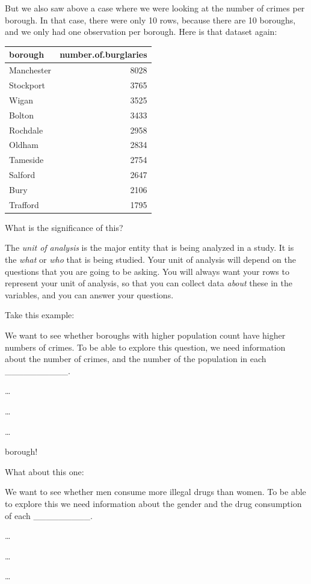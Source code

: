 \documentclass[
]{book}
\begin{document}
But we also saw above a case where we were looking at the number of crimes per borough. In that case, there were only 10 rows, because there are 10 boroughs, and we only had one observation per borough. Here is that dataset again:

\begin{tabular}{l|r}
\hline
borough & number.of.burglaries\\
\hline
Manchester & 8028\\
\hline
Stockport & 3765\\
\hline
Wigan & 3525\\
\hline
Bolton & 3433\\
\hline
Rochdale & 2958\\
\hline
Oldham & 2834\\
\hline
Tameside & 2754\\
\hline
Salford & 2647\\
\hline
Bury & 2106\\
\hline
Trafford & 1795\\
\hline
\end{tabular}

What is the significance of this?

The \emph{unit of analysis} is the major entity that is being analyzed in a study. It is the \emph{what} or \emph{who} that is being studied. Your unit of analysis will depend on the questions that you are going to be asking. You will always want your rows to represent your unit of analysis, so that you can collect data \emph{about} these in the variables, and you can answer your questions.

Take this example:

We want to see whether boroughs with higher population count have higher numbers of crimes. To be able to explore this question, we need information about the number of crimes, and the number of the population in each \_\_\_\_\_\_\_\_\_\_.

\ldots{}

\ldots{}

\ldots{}

borough!

What about this one:

We want to see whether men consume more illegal drugs than women. To be able to explore this we need information about the gender and the drug consumption of each \_\_\_\_\_\_\_\_\_.

\ldots{}

\ldots{}

\ldots{}
\end{document}
